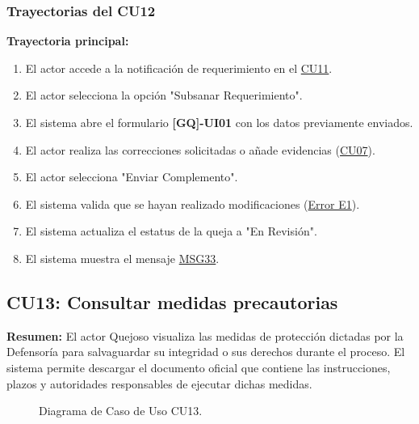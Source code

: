 \begin{appendices}
\subsubsection{Trayectorias del CU12}
\textbf{Trayectoria principal:}
\begin{enumerate}[nosep]
    \item El actor accede a la notificación de requerimiento en el \hyperlink{anexo:casos_uso}{CU11}.
    \item El actor selecciona la opción "Subsanar Requerimiento".
    \item El sistema abre el formulario \textbf{[GQ]-UI01} con los datos previamente enviados.
    \item El actor realiza las correcciones solicitadas o añade evidencias (\hyperlink{anexo:casos_uso}{CU07}).
    \item El actor selecciona "Enviar Complemento".
    \item El sistema valida que se hayan realizado modificaciones (\hyperlink{err:E17}{Error E1}).
    \item El sistema actualiza el estatus de la queja a "En Revisión".
    \item El sistema muestra el mensaje \hyperlink{msg:MSG33}{MSG33}.
\end{enumerate}

\newpage

\subsection{CU13: Consultar medidas precautorias}

\textbf{Resumen:} 
El actor Quejoso visualiza las medidas de protección dictadas por la Defensoría para salvaguardar su integridad o sus derechos durante el proceso. El sistema permite descargar el documento oficial que contiene las instrucciones, plazos y autoridades responsables de ejecutar dichas medidas.

\begin{figure}[htbp]
    \centering
    \figCUtrece
    \caption{Diagrama de Caso de Uso CU13.}
    \label{fig:cu13}
\end{figure}


\end{appendices}
